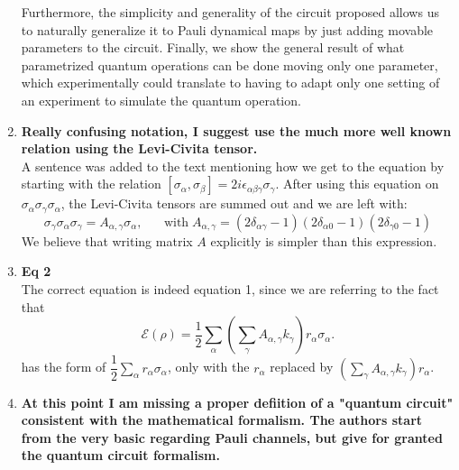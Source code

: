 \documentclass[10pt,letterpaper]{article} %
\begin{document}
\begin{enumerate}
Furthermore, the simplicity and generality of the circuit proposed allows us to
naturally generalize it to Pauli dynamical maps by just
adding movable parameters to the circuit.
Finally, we show the general result of what parametrized quantum operations can be done 
moving only one parameter, which experimentally could translate
to having to adapt only one setting of an experiment
to simulate the quantum operation.




\item \textbf{ Really confusing notation, I suggest use the much more well known relation using the Levi-Civita tensor.}\\


A sentence was added to the text mentioning how we get to the equation by starting with the relation $[\sigma_\alpha,\sigma_\beta] = 2 i
\epsilon_{\alpha \beta \gamma} \sigma_\gamma$.
After using this equation on $\sigma_{\alpha} \sigma_{\gamma} \sigma_{\alpha}$, the Levi-Civita tensors are summed out and we are left with:
\begin{equation*}
\sigma_{\gamma} \sigma_{\alpha} \sigma_{\gamma}  =   A_{\alpha,\gamma} \sigma_{\alpha}, \;\;\;\;\;\; \text{with} \; A_{\alpha, \gamma} = (2\delta_{\alpha \gamma}-1)(2\delta_{\alpha 0}-1)(2\delta_{\gamma 0}-1)
\end{equation*}
We believe that writing matrix $A$ explicitly is simpler than this expression. 

\item \textbf{Eq 2} \\

The correct equation is indeed equation 1, since we are referring to the fact that 
\begin{equation}
\label{eq: rho-transformada}
\mathcal{E}(\rho) = \dfrac{1}{2} \sum_{\alpha} \left(\sum_{\gamma} A_{\alpha, \gamma} k_{\gamma} \right) r_{\alpha} \sigma_{\alpha}.
\end{equation}
has the form of $\dfrac{1}{2} \sum_{\alpha} r_{\alpha} \sigma_{\alpha}$, only with the
$r_{\alpha}$ replaced by $\left( \sum_{\gamma} A_{\alpha,\gamma} k_{\gamma} \right) r_{\alpha}$.


\item \textbf{At this point I am missing a proper defiition of a "quantum circuit" consistent with the mathematical formalism. The authors start from the very basic regarding Pauli channels, but give for granted the quantum circuit formalism.} \\


\end{enumerate}
\end{document}

